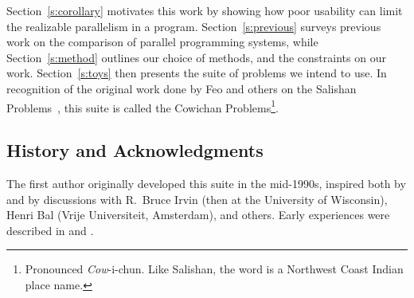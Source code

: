 Section~\ref{s:corollary} motivates this work by showing
how poor usability can limit the realizable parallelism in a program.
Section~\ref{s:previous} surveys previous work on the comparison of parallel programming systems,
while Section~\ref{s:method} outlines our choice of methods, and the constraints on our work.
Section~\ref{s:toys} then presents the suite of problems we intend to use.
In recognition of the original work done by Feo and others on
the Salishan Problems~\cite{b:salishan}, this suite is called
the Cowichan Problems\footnote{\noindent Pronounced {\em{Cow}\/}-i-chun.
	Like Salishan, the word is a Northwest Coast Indian place name.}.

\subsection*{History and Acknowledgments}

The first author originally developed this suite in the mid-1990s,
inspired both by \cite{b:salishan} and by
discussions with R.\ Bruce Irvin (then at the University of Wisconsin),
Henri Bal (Vrije Universiteit, Amsterdam),
and others.
Early experiences were described in \cite{b:cowichan-ifip} and \cite{b:cowichan-orca}.
